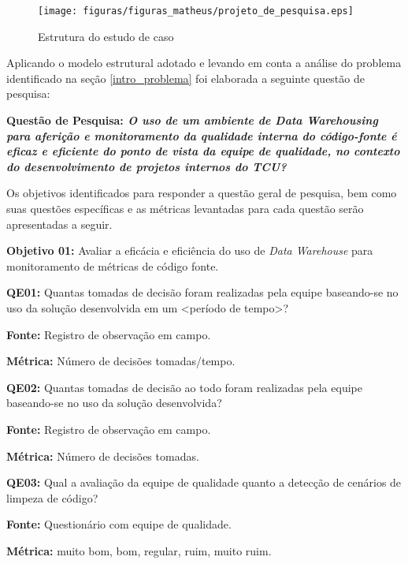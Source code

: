\begin{figure}[h!]
\centering
\texttt{[image: figuras/figuras\_matheus/projeto\_de\_pesquisa.eps]}
\caption{Estrutura do estudo de caso}
\label{fig:pesquisa}
\end{figure}
\FloatBarrier

Aplicando o modelo estrutural adotado e levando em conta a análise do problema identificado na seção \ref{intro_problema} foi elaborada a seguinte questão de pesquisa:

\textbf{Questão de Pesquisa: \textit{O uso de um ambiente de Data Warehousing para aferição e monitoramento da qualidade interna do código-fonte é eficaz e eficiente do ponto de vista da equipe de qualidade, no contexto do desenvolvimento de projetos internos do TCU?}}

Os objetivos identificados para responder a questão geral de pesquisa, bem como suas questões específicas e as métricas levantadas para cada questão serão apresentadas a seguir.

\textbf{Objetivo 01:} Avaliar a eficácia e eficiência do uso de \textit{Data Warehouse} para monitoramento de métricas de código fonte. \newline


\textbf{QE01:} Quantas tomadas de decisão foram realizadas pela equipe baseando-se no uso da solução desenvolvida em um <período de tempo>?

\textbf{Fonte:} Registro de observação em campo.

\textbf{Métrica:} Número de decisões tomadas/tempo. \newline


\textbf{QE02: } Quantas tomadas de decisão ao todo foram realizadas pela equipe baseando-se no uso da solução desenvolvida?

\textbf{Fonte:} Registro de observação em campo.

\textbf{Métrica:} Número de decisões tomadas. \newline



\textbf{QE03: } Qual a avaliação da equipe de qualidade quanto a detecção de cenários de limpeza de código?

\textbf{Fonte:} Questionário com equipe de qualidade.

\textbf{Métrica:} muito bom, bom, regular, ruim, muito ruim. \newline

